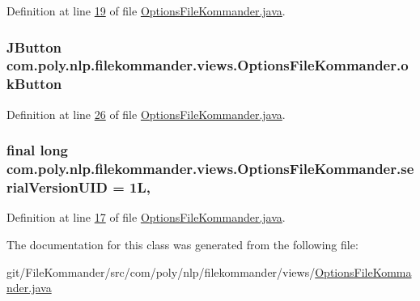 Definition at line \hyperlink{L19}{19} of file \hyperlink{}{Options\-File\-Kommander.\-java}.

\hypertarget{classcom_1_1poly_1_1nlp_1_1filekommander_1_1views_1_1_options_file_kommander_a0f8aef931bc85b51505210be4fbc87e1}{
\subsubsection[{ok\-Button}]{\setlength{\rightskip}{0pt plus 5cm}J\-Button com.\-poly.\-nlp.\-filekommander.\-views.\-Options\-File\-Kommander.\-ok\-Button\hspace{0.3cm}{\ttfamily [private]}}}\label{classcom_1_1poly_1_1nlp_1_1filekommander_1_1views_1_1_options_file_kommander_a0f8aef931bc85b51505210be4fbc87e1}


Definition at line \hyperlink{L26}{26} of file \hyperlink{}{Options\-File\-Kommander.\-java}.

\hypertarget{classcom_1_1poly_1_1nlp_1_1filekommander_1_1views_1_1_options_file_kommander_aa50f9fa645b0df5ee340104231031857}{
\subsubsection[{serial\-Version\-U\-I\-D}]{\setlength{\rightskip}{0pt plus 5cm}final long com.\-poly.\-nlp.\-filekommander.\-views.\-Options\-File\-Kommander.\-serial\-Version\-U\-I\-D = 1\-L\hspace{0.3cm}{\ttfamily [static]}, {\ttfamily [private]}}}\label{classcom_1_1poly_1_1nlp_1_1filekommander_1_1views_1_1_options_file_kommander_aa50f9fa645b0df5ee340104231031857}


Definition at line \hyperlink{L17}{17} of file \hyperlink{}{Options\-File\-Kommander.\-java}.



The documentation for this class was generated from the following file\-:\begin{DoxyCompactItemize}
\item 
git/\-File\-Kommander/src/com/poly/nlp/filekommander/views/\hyperlink{_options_file_kommander_8java}{Options\-File\-Kommander.\-java}\end{DoxyCompactItemize}
